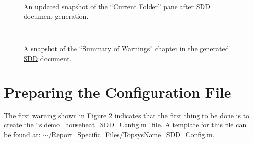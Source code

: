 \documentclass{mcscert}
\begin{document}
\begin{figure}
	\caption{An updated snapshot of the ``Current Folder'' pane after \hyperref[acr:sdd]{SDD} document generation.}
	\centering
	\label{fig:current-folder-2}
	\\
\end{figure}
\begin{figure}
	\caption{A snapshot of the ``Summary of Warnings'' chapter in the generated	\hyperref[acr:sdd]{SDD} document.}
	\centering
	\label{fig:summary-of-warnings}
    \\
\end{figure}

\section*{Preparing the Configuration File}
The first warning shown in Figure \ref{fig:summary-of-warnings} indicates that the first thing to be done is to create the ``sldemo\_househeat\_SDD\_Config.m'' file. 
A template for this file can be found at: $\sim$/Report\_Specific\_Files/TopsysName\_SDD\_Config.m.
\end{document}
